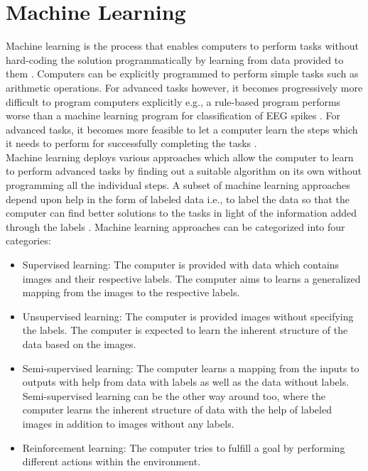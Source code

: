 \section{Machine Learning}
Machine learning is the process that enables computers to perform tasks without hard-coding the solution programmatically by learning from data provided to them \cite{alpaydin2020}. Computers can be explicitly programmed to perform simple tasks such as arithmetic operations. For advanced tasks however, it becomes progressively more difficult to program computers explicitly e.g., a rule-based program performs worse than a machine learning program for classification of EEG spikes \cite{ganglberger2017}. For advanced tasks, it becomes more feasible to let a computer learn the steps which it needs to perform for successfully completing the tasks \cite{samuel1959}. \\
Machine learning deploys various approaches which allow the computer to learn to perform advanced tasks by finding out a suitable algorithm on its own without programming all the individual steps. A subset of machine learning approaches depend upon help in the form of labeled data i.e., to label the data so that the computer can find better solutions to the tasks in light of the information added through the labels \cite{bishop2006}. Machine learning approaches can be categorized into four categories:
\begin{itemize}
  \setlength\itemsep{0em}
  \item Supervised learning: The computer is provided with data which contains images and their respective labels. The computer aims to learns a generalized mapping from the images to the respective labels.
  \item Unsupervised learning: The computer is provided images without specifying the labels. The computer is expected to learn the inherent structure of the data based on the images.
  \item Semi-supervised learning: The computer learns a mapping from the inputs to outputs with help from data with labels as well as the data without labels. Semi-supervised learning can be the other way around too, where the computer learns the inherent structure of data with the help of labeled images in addition to images without any labels.
  \item Reinforcement learning: The computer tries to fulfill a goal by performing different actions within the environment.
\end{itemize}


